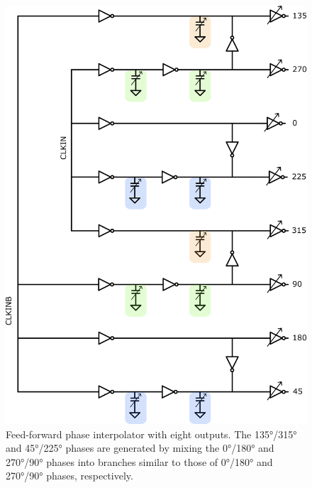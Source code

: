 \begin{figure}[htbp]
  \centering
  \includegraphics[width=0.6\linewidth]{figures/Schematics/ff_8out.png}
  \caption{Feed-forward phase interpolator with eight outputs. The \ang{135}/\ang{315} and \ang{45}/\ang{225} phases are generated by mixing the \ang{0}/\ang{180} and \ang{270}/\ang{90} phases into branches similar to those of \ang{0}/\ang{180} and \ang{270}/\ang{90} phases, respectively.}
  \label{fig:FF_8out}
\end{figure}

